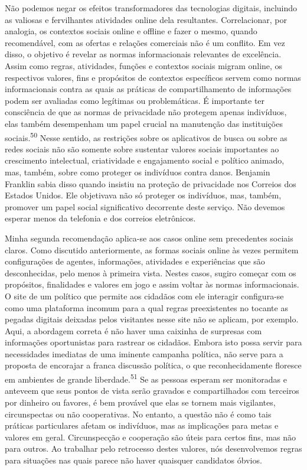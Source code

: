 Não podemos negar os efeitos transformadores das tecnologias digitais,
incluindo as valiosas e fervilhantes atividades online dela resultantes.
Correlacionar, por analogia, os contextos sociais online e offline e
fazer o mesmo, quando recomendável, com as ofertas e relações comerciais
não é um conflito. Em vez disso, o objetivo é revelar as normas
informacionais relevantes de excelência. Assim como regras, atividades,
funções e contextos sociais migram online, os respectivos valores, fins
e propósitos de contextos específicos servem como normas informacionais
contra as quais as práticas de compartilhamento de informações podem ser
avaliadas como legítimas ou problemáticas. É importante ter consciência
de que as normas de privacidade não protegem apenas indivíduos, elas
também desempenham um papel crucial na manutenção das instituições
sociais.\textsuperscript{{50}} Nesse sentido, as restrições sobre os
aplicativos de busca ou sobre as redes sociais não são somente sobre
sustentar valores sociais importantes ao crescimento intelectual,
criatividade e engajamento social e político animado, mas, também, sobre
como proteger os indivíduos contra danos. Benjamin Franklin sabia disso
quando insistiu na proteção de privacidade nos Correios dos Estados
Unidos. Ele objetivava não só proteger os indivíduos, mas, também,
promover um papel social significativo decorrente deste serviço. Não
devemos esperar menos da telefonia e dos correios eletrônicos.

Minha segunda recomendação aplica-se aos casos online sem precedentes
sociais claros. Como discutido anteriormente, as formas sociais online
às vezes permitem configurações de agentes, informações, atividades e
experiências que são desconhecidas, pelo menos à primeira vista. Nestes
casos, sugiro começar com os propósitos, finalidades e valores em jogo e
assim voltar às normas informacionais. O site de um político que permite
aos cidadãos com ele interagir configura-se como uma plataforma incomum
para a qual regras preexistentes no tocante as pegadas digitais deixadas
pelos visitantes nesse site não se aplicam, por exemplo. Aqui, a
abordagem correta é não haver uma caixinha de surpresas com informações
oportunistas para rastrear os cidadãos. Embora isto possa servir para
necessidades imediatas de uma iminente campanha política, não serve para
a proposta de encorajar a franca discussão política, o que
reconhecidamente floresce em ambientes de grande
liberdade.\textsuperscript{{51}} Se as pessoas esperam ser monitoradas e
anteveem que seus pontos de vista serão gravados e compartilhados com
terceiros por dinheiro ou favores, é bem provável que elas se tornem
mais vigilantes, circunspectas ou não cooperativas. No entanto, a
questão não é como tais práticas particulares afetam os indivíduos, mas
as implicações para metas e valores em geral. Circunspecção e cooperação
são úteis para certos fins, mas não para outros. Ao trabalhar pelo
retrocesso destes valores, nós desenvolvemos regras para situações nas
quais parece não haver quaisquer candidatos óbvios.

